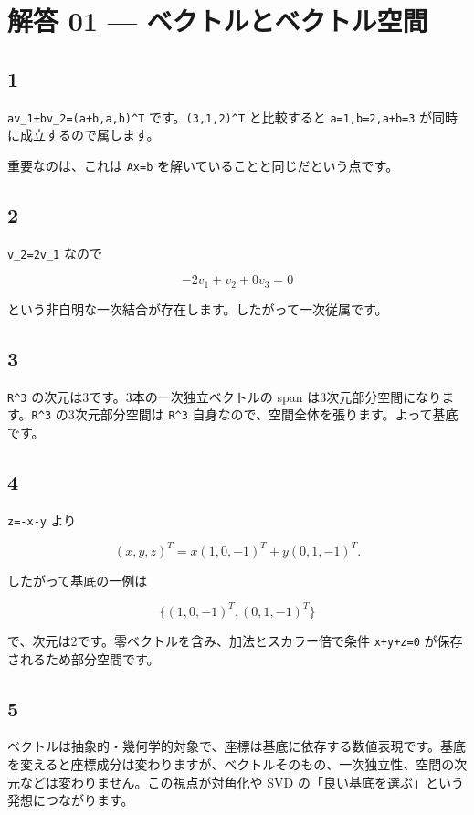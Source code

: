 \documentclass[
  11pt,
  a4paper,
]{ltjsarticle}
\author{}
\date{}
\begin{document}
\hypertarget{ux89e3ux7b54-01-ux30d9ux30afux30c8ux30ebux3068ux30d9ux30afux30c8ux30ebux7a7aux9593}{%
\section{解答 01 ---
ベクトルとベクトル空間}\label{ux89e3ux7b54-01-ux30d9ux30afux30c8ux30ebux3068ux30d9ux30afux30c8ux30ebux7a7aux9593}}

\hypertarget{section}{%
\subsection{1}\label{section}}

\texttt{av\_1+bv\_2=(a+b,a,b)\^{}T} です。\texttt{(3,1,2)\^{}T}
と比較すると \texttt{a=1,b=2,a+b=3} が同時に成立するので属します。

重要なのは、これは \texttt{Ax=b} を解いていることと同じだという点です。

\hypertarget{section-1}{%
\subsection{2}\label{section-1}}

\texttt{v\_2=2v\_1} なので

\[
-2v_1+v_2+0v_3=0
\]

という非自明な一次結合が存在します。したがって一次従属です。

\hypertarget{section-2}{%
\subsection{3}\label{section-2}}

\texttt{R\^{}3} の次元は3です。3本の一次独立ベクトルの span
は3次元部分空間になります。\texttt{R\^{}3} の3次元部分空間は
\texttt{R\^{}3} 自身なので、空間全体を張ります。よって基底です。

\hypertarget{section-3}{%
\subsection{4}\label{section-3}}

\texttt{z=-x-y} より

\[
(x,y,z)^T=x(1,0,-1)^T+y(0,1,-1)^T.
\]

したがって基底の一例は

\[
\{(1,0,-1)^T,(0,1,-1)^T\}
\]

で、次元は2です。零ベクトルを含み、加法とスカラー倍で条件
\texttt{x+y+z=0} が保存されるため部分空間です。

\hypertarget{section-4}{%
\subsection{5}\label{section-4}}

ベクトルは抽象的・幾何学的対象で、座標は基底に依存する数値表現です。基底を変えると座標成分は変わりますが、ベクトルそのもの、一次独立性、空間の次元などは変わりません。この視点が対角化や
SVD の「良い基底を選ぶ」という発想につながります。
\end{document}
